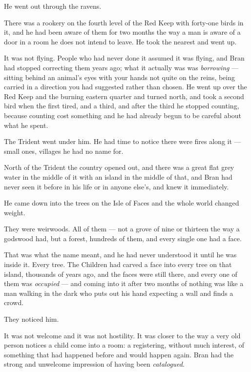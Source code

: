 \sceneBreak

He went out through the ravens.

There was a rookery on the fourth level of the Red Keep with forty-one birds in it, and he had been aware of them for two months the way a man is aware of a door in a room he does not intend to leave. He took the nearest and went up.

It was not flying. People who had never done it assumed it was flying, and Bran had stopped correcting them years ago; what it actually was was \textit{borrowing} — sitting behind an animal’s eyes with your hands not quite on the reins, being carried in a direction you had suggested rather than chosen. He went up over the Red Keep and the burning eastern quarter and turned north, and took a second bird when the first tired, and a third, and after the third he stopped counting, because counting cost something and he had already begun to be careful about what he spent.

The Trident went under him. He had time to notice there were fires along it — small ones, villages he had no name for.

North of the Trident the country opened out, and there was a great flat grey water in the middle of it with an island in the middle of that, and Bran had never seen it before in his life or in anyone else’s, and knew it immediately.

\sceneBreak

He came down into the trees on the Isle of Faces and the whole world changed weight.

They were weirwoods. All of them — not a grove of nine or thirteen the way a godswood had, but a forest, hundreds of them, and every single one had a face.

That was what the name meant, and he had never understood it until he was inside it. Every tree. The Children had carved a face into every tree on that island, thousands of years ago, and the faces were still there, and every one of them was \textit{occupied} — and coming into it after two months of nothing was like a man walking in the dark who puts out his hand expecting a wall and finds a crowd.

They noticed him.

It was not welcome and it was not hostility. It was closer to the way a very old person notices a child come into a room: a registering, without much interest, of something that had happened before and would happen again. Bran had the strong and unwelcome impression of having been \textit{catalogued}.

